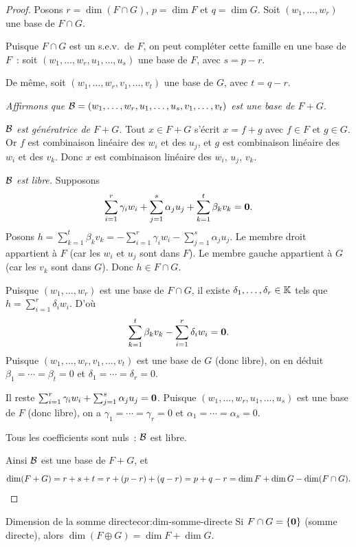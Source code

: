 \begin{proof}
  Posons $r=\dim(F\cap G)$, $p=\dim F$ et $q=\dim G$. Soit
  $(w_1,\ldots,w_r)$ une base de $F\cap G$.

  Puisque $F\cap G$ est un s.e.v.\ de $F$, on peut compléter cette
  famille en une base de $F$~: soit $(w_1,\ldots,w_r,u_1,\ldots,u_s)$
  une base de $F$, avec $s=p-r$.

  De même, soit $(w_1,\ldots,w_r,v_1,\ldots,v_t)$ une base de $G$,
  avec $t=q-r$.

  \emph{Affirmons que ${\mathcal{B}}=(w_1,\ldots,w_r,u_1,\ldots,u_s,v_1,\ldots,v_t)$
  est une base de $F+G$.}

  \medskip
  \emph{${\mathcal{B}}$ est génératrice de $F+G$.} Tout $x\in F+G$ s'écrit
  $x=f+g$ avec $f\in F$ et $g\in G$. Or $f$ est combinaison linéaire
  des $w_i$ et des $u_j$, et $g$ est combinaison linéaire des $w_i$
  et des $v_k$. Donc $x$ est combinaison linéaire des $w_i$, $u_j$,
  $v_k$.

  \medskip
  \emph{${\mathcal{B}}$ est libre.} Supposons
  \[
    \sum_{i=1}^{r}\gamma_i w_i + \sum_{j=1}^{s}\alpha_j u_j
    + \sum_{k=1}^{t}\beta_k v_k = \mathbf{0}.
  \]
  Posons $h = \sum_{k=1}^{t}\beta_k v_k =
  -\sum_{i=1}^{r}\gamma_i w_i - \sum_{j=1}^{s}\alpha_j u_j$.
  Le membre droit appartient à $F$ (car les $w_i$ et $u_j$ sont dans
  $F$). Le membre gauche appartient à $G$ (car les $v_k$ sont dans
  $G$). Donc $h\in F\cap G$.

  Puisque $(w_1,\ldots,w_r)$ est une base de $F\cap G$, il existe
  $\delta_1,\ldots,\delta_r\in{\mathbb{K}}$ tels que
  $h=\sum_{i=1}^{r}\delta_i w_i$. D'où
  \[
    \sum_{k=1}^{t}\beta_k v_k - \sum_{i=1}^{r}\delta_i w_i = \mathbf{0}.
  \]
  Puisque $(w_1,\ldots,w_r,v_1,\ldots,v_t)$ est une base de $G$ (donc
  libre), on en déduit $\beta_1=\cdots=\beta_t=0$ et
  $\delta_1=\cdots=\delta_r=0$.

  Il reste $\sum_{i=1}^{r}\gamma_i w_i + \sum_{j=1}^{s}\alpha_j u_j
  = \mathbf{0}$. Puisque $(w_1,\ldots,w_r,u_1,\ldots,u_s)$ est une base
  de $F$ (donc libre), on a $\gamma_1=\cdots=\gamma_r=0$ et
  $\alpha_1=\cdots=\alpha_s=0$.

  Tous les coefficients sont nuls~: ${\mathcal{B}}$ est libre.

  \medskip
  Ainsi ${\mathcal{B}}$ est une base de $F+G$, et
  \[
    \dim(F+G) = r+s+t = r+(p-r)+(q-r) = p+q-r = \dim F+\dim G-\dim(F\cap G).
    \qedhere
  \]
\end{proof}

\begin{corollary}{Dimension de la somme directe}{cor:dim-somme-directe}
  Si $F\cap G=\left\{\mathbf{0}\right\}$ (somme directe), alors
  $\dim(F\oplus G)=\dim F+\dim G$.
\end{corollary}

